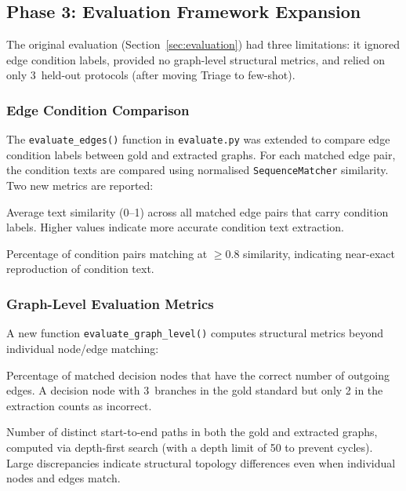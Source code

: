 \documentclass[12pt,a4paper]{article}
\begin{document}
\subsection{Phase 3: Evaluation Framework Expansion}
\label{sec:phase3}

The original evaluation (Section~\ref{sec:evaluation}) had three limitations: it ignored edge condition labels, provided no graph-level structural metrics, and relied on only 3~held-out protocols (after moving Triage to few-shot).

\subsubsection{Edge Condition Comparison}

The \texttt{evaluate\_edges()} function in \texttt{evaluate.py} was extended to compare edge condition labels between gold and extracted graphs. For each matched edge pair, the condition texts are compared using normalised \texttt{SequenceMatcher} similarity. Two new metrics are reported:

\begin{description}[leftmargin=2em]
    \item[Condition Similarity:] Average text similarity (0--1) across all matched edge pairs that carry condition labels. Higher values indicate more accurate condition text extraction.
    \item[Condition Exact Match Rate:] Percentage of condition pairs matching at $\geq$0.8 similarity, indicating near-exact reproduction of condition text.
\end{description}

\subsubsection{Graph-Level Evaluation Metrics}

A new function \texttt{evaluate\_graph\_level()} computes structural metrics beyond individual node/edge matching:

\begin{description}[leftmargin=2em]
    \item[Branching Accuracy:] Percentage of matched decision nodes that have the correct number of outgoing edges. A decision node with 3~branches in the gold standard but only 2 in the extraction counts as incorrect.
    \item[Path Count:] Number of distinct start-to-end paths in both the gold and extracted graphs, computed via depth-first search (with a depth limit of 50 to prevent cycles). Large discrepancies indicate structural topology differences even when individual nodes and edges match.
\end{description}
\end{document}
